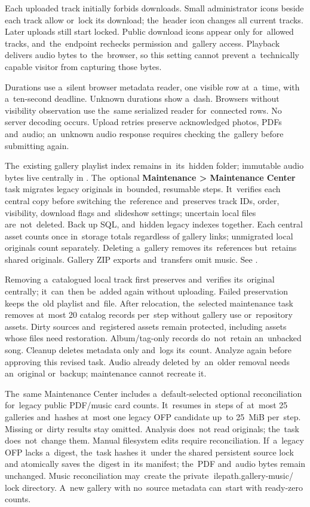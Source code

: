 \documentclass[11pt,a4paper]{article}
\newcommand{\filepath}[1]{\path{#1}}
\newcommand{\ui}[1]{\textbf{#1}}
\begin{document}
Each uploaded track initially forbids downloads. Small administrator icons
beside each track allow or~lock its download; the~header icon changes all
current tracks. Later uploads still start locked. Public download icons appear
only for~allowed tracks, and~the~endpoint rechecks permission and~gallery
access. Playback delivers audio bytes to~the~browser, so this setting cannot
prevent a~technically capable visitor from capturing those bytes.

Durations use a~silent browser metadata reader, one visible row at~a~time, with
a~ten-second deadline. Unknown durations show a~dash. Browsers without
visibility observation use the~same serialized reader for~connected rows. No
server decoding occurs. Upload retries preserve acknowledged photos, PDFs
and~audio; an~unknown audio response requires checking the~gallery before
submitting again.

The~existing gallery playlist index remains in~its~hidden
\filepath{.gallery-music/} folder; immutable audio bytes live centrally in
\filepath{data/music/}. The~optional \ui{Maintenance > Maintenance Center} task
migrates legacy originals in~bounded, resumable steps. It~verifies each central
copy before switching the~reference and~preserves track IDs, order, visibility,
download flags and~slideshow settings; uncertain local files are~not~deleted.
Back up SQL, \filepath{data/music/} and~hidden legacy
indexes together. Each central asset counts once in~storage totals regardless of
gallery links; unmigrated local originals count separately. Deleting a~gallery
removes its~references but~retains shared originals. Gallery ZIP exports
and~transfers
omit music. See \filepath{docs/GALLERY_MUSIC.md}.

Removing a~catalogued local track first preserves and~verifies its~original
centrally; it~can~then be~added again without uploading. Failed preservation
keeps the~old playlist and~file. After relocation, the~selected maintenance task
removes at~most 20 catalog records per~step without gallery use or~repository
assets. Dirty sources and~registered assets remain protected, including assets
whose files need restoration. Album/tag-only records do~not~retain an~unbacked
song. Cleanup deletes metadata only and~logs its~count. Analyze again before
approving this revised task. Audio already deleted by~an~older removal needs
an~original or~backup; maintenance cannot recreate it.

The~same Maintenance Center includes a~default-selected optional
reconciliation for~legacy public PDF/music card counts. It~resumes in~steps
of~at~most 25 galleries and~hashes at~most one legacy OFP candidate up~to
25~MiB per~step. Missing or~dirty results stay omitted. Analysis does~not
read originals; the~task does~not~change them. Manual filesystem edits require
reconciliation. If~a~legacy OFP lacks a~digest, the~task hashes it~under the
shared persistent source lock and atomically saves the~digest in~its manifest;
the~PDF and~audio bytes remain unchanged. Music reconciliation may~create the
private ilepath{.gallery-music/} lock directory. A~new gallery with no~source
metadata can~start with ready-zero counts.
\end{document}

